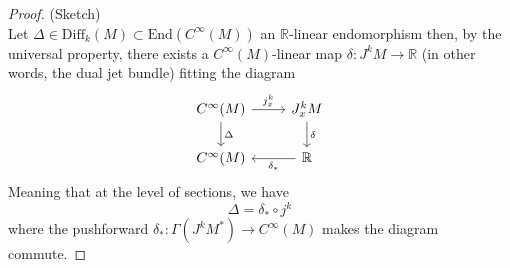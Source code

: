 \begin{proof}{(Sketch)\\}
    Let $\Delta \in \mathrm{Diff}_k(M) \subset \mathrm{End}(C^\infty(M))$ an $\mathbb{R}$-linear endomorphism then, by the universal property, there exists a $C^\infty(M)$-linear map $\delta : J^k M \rightarrow \mathbb{R}$ (in other words, the dual jet bundle) fitting the diagram
    \begin{equation}
        \begin{tikzcd}
            C^\infty(M) \arrow["j^k_x"]{r} \arrow["\Delta"]{d}& J^k_x M \arrow["\delta"]{d} \\
            C^\infty(M) & \mathbb{R} \arrow["\delta_*"]{l}
        \end{tikzcd}
    \end{equation}
    Meaning that at the level of sections, we have 
    \begin{equation}
        \Delta = \delta_* \circ j^k
    \end{equation}
    where the pushforward $\delta_*: \Gamma(J^k M ^*) \rightarrow C^\infty(M)$ makes the diagram commute.
\end{proof}
% 

